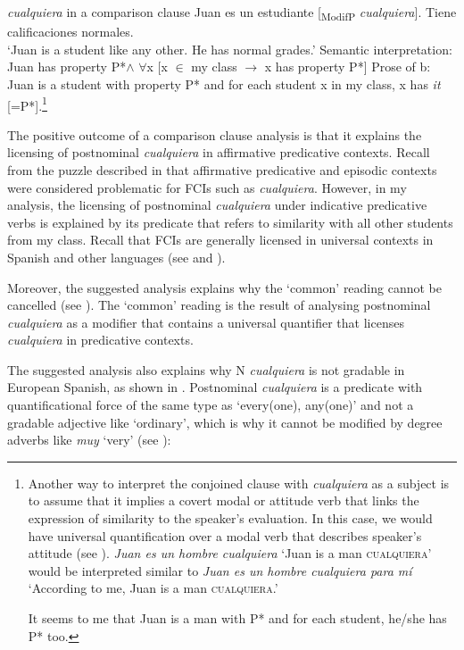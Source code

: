{\ea \label{bkm:Ref54682554} %
\textit{cualquiera} in a comparison clause
\ea Juan es un estudiante [\textsubscript{ModifP} \textit{cualquiera}]. Tiene calificaciones normales.\\ 
‘Juan is a student like any other. He has normal grades.’
\ex Semantic interpretation: Juan has property P*$\land$ $\forall$x [x $\in$ my class $\rightarrow$ x has property P*]
\ex Prose of b: Juan is a student with property P* and for each student x in my class, x has \textit{it} [=P*].\footnote{{Another
    way to interpret the conjoined clause with} {\textit{cualquiera}} {as a subject is to assume that it implies a covert modal or attitude verb that links the expression of similarity to the speaker’s evaluation. In this case, we would have universal quantification over a modal verb that describes speaker’s attitude (see ).} {\textit{Juan es un hombre cualquiera} ‘Juan is a man \textsc{cualquiera}’} {would be interpreted similar to} {\textit{Juan es un hombre cualquiera para mí} ‘According to me, Juan is a man \textsc{cualquiera}.’}
    
  \ea
  {It seems to me that Juan is a man with P* and for each student, he/she has P* too.}
  \z
}
  \z
\z

The positive outcome of a comparison clause analysis is that it explains the licensing of postnominal \textit{cualquiera} in affirmative predicative contexts. Recall from the puzzle described in  that affirmative predicative and episodic contexts were considered problematic for FCIs such as \textit{cualquiera}. However, in my analysis, the licensing of postnominal \textit{cualquiera} under indicative predicative verbs is explained by its predicate that refers to similarity with all other students from my class. Recall that FCIs are generally licensed in universal contexts in Spanish and other languages (see  and ).

Moreover, the suggested analysis explains why the ‘common’ reading cannot be cancelled (see ). The ‘common’ reading is the result of analysing postnominal \textit{cualquiera} as a modifier that contains a universal quantifier that licenses \textit{cualquiera} in predicative contexts. 

The suggested analysis also explains why N \textit{cualquiera} is not gradable in European Spanish, as shown in . Postnominal \textit{cualquiera} is a predicate with quantificational force of the same type as ‘every(one), any(one)’ and not a gradable adjective like ‘ordinary’, which is why it cannot be modified by degree adverbs like \textit{muy} ‘very’ (see ):

}
